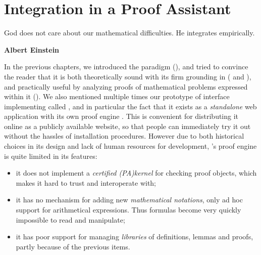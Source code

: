 \setchapterpreamble[u]{\margintoc}
\chapter{Integration in a Proof Assistant}

\epigraph{God does not care about our mathematical difficulties. He integrates
empirically.}{\textbf{Albert Einstein}}

In the previous chapters, we introduced the  paradigm
(), and tried to convince the reader that it is both theoretically
sound with its firm grounding in  
( and ), and practically useful by analyzing
proofs of mathematical problems expressed within it (). We also
mentioned multiple times our prototype of interface implementing  called
, and in particular the fact that it exists as a \emph{standalone}
web application with its own proof engine \cite{Actema:link}. This is
convenient for distributing it online as a publicly available website, so that
people can immediately try it out without the hassles of installation
procedures. However due to both historical choices in its design and lack of
human resources for development, 's proof engine is quite limited in
its features:
\begin{itemize}
  \itemAP it can only handle  expressed in many-sorted
      (), whereas all
    state-of-the-art  support \emph{} logic in one
    form or another; and  features are crucial for formalizing
    many mathematical notions in a concise way, as witnessed by the example of
    ;
  \item it does not implement a \emph{certified \kl(PA){kernel}} for checking
    proof objects, which makes it hard to trust and interoperate with;
  \item it has no mechanism for adding new \emph{mathematical notations}, only
    ad hoc support for arithmetical expressions. Thus formulas become very
    quickly impossible to read and manipulate;
  \item it has poor support for managing \emph{libraries} of definitions, lemmas
    and proofs, partly because of the previous items.
\end{itemize}

